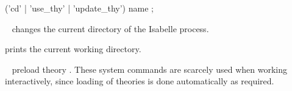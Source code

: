 \begin{isabellebody}
\begin{isamarkuptext}
  \begin{rail}
    ('cd' | 'use\_thy' | 'update\_thy') name
    ;
  \end{rail}

  \begin{description}

  \item \hyperlink{command.cd}{\mbox{}}~ changes the current directory
  of the Isabelle process.

  \item \hyperlink{command.pwd}{\mbox{}} prints the current working directory.

  \item \hyperlink{command.use-thy}{\mbox{}}~ preload theory .
  These system commands are scarcely used when working interactively,
  since loading of theories is done automatically as required.

  \end{description}%
\end{isamarkuptext}%
\isamarkuptrue%
%
\isadelimtheory
%
\endisadelimtheory
%
\isatagtheory
{}\isamarkupfalse%
%
\endisatagtheory
{\isafoldtheory}%
%
\isadelimtheory
%
\endisadelimtheory
\isanewline
\end{isabellebody}%
